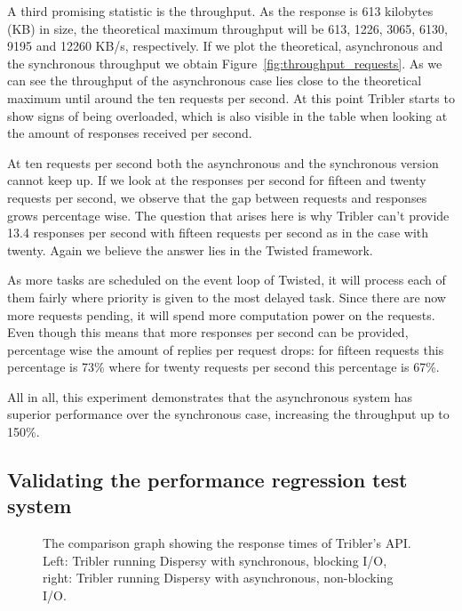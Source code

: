 A third promising statistic is the throughput.
As the response is 613 kilobytes (KB) in size, the theoretical maximum throughput will be 613, 1226, 3065, 6130, 9195 and 12260 KB/s, respectively.
If we plot the theoretical, asynchronous and the synchronous throughput we obtain Figure~\ref{fig:throughput_requests}.
As we can see the throughput of the asynchronous case lies close to the theoretical maximum until around the ten requests per second.
At this point Tribler starts to show signs of being overloaded, which is also visible in the table when looking at the amount of responses received per second.

At ten requests per second both the asynchronous and the synchronous version cannot keep up.
If we look at the responses per second for fifteen and twenty requests per second, we observe that the gap between requests and responses grows percentage wise.
The question that arises here is why Tribler can't provide 13.4 responses per second with fifteen requests per second as in the case with twenty.
Again we believe the answer lies in the Twisted framework.

As more tasks are scheduled on the event loop of Twisted, it will process each of them fairly where priority is given to the most delayed task.
Since there are now more requests pending, it will spend more computation power on the requests.
Even though this means that more responses per second can be provided, percentage wise the amount of replies per request drops: for fifteen requests this percentage is 73\% where for twenty requests per second this percentage is 67\%.

All in all, this experiment demonstrates that the asynchronous system has superior performance over the synchronous case, increasing the throughput up to 150\%.

\subsection{Validating the performance regression test system}

\begin{figure}[!h]
	\centering
	\caption{The comparison graph showing the response times of Tribler's API. Left: Tribler running Dispersy with synchronous, blocking I/O, right: Tribler running Dispersy with asynchronous, non-blocking I/O.}
	\label{fig:tribler_response_times_comparison}
\end{figure} 

